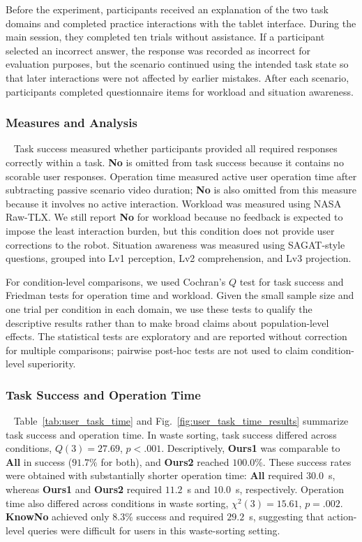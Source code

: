 Before the experiment, participants received an explanation of the two task domains and completed practice interactions with the tablet interface. During the main session, they completed ten trials without assistance. If a participant selected an incorrect answer, the response was recorded as incorrect for evaluation purposes, but the scenario continued using the intended task state so that later interactions were not affected by earlier mistakes. After each scenario, participants completed questionnaire items for workload and situation awareness.

\subsubsection{Measures and Analysis}~\label{user:measures}
Task success measured whether participants provided all required responses correctly within a task. \textbf{No} is omitted from task success because it contains no scorable user responses. Operation time measured active user operation time after subtracting passive scenario video duration; \textbf{No} is also omitted from this measure because it involves no active interaction. Workload was measured using NASA Raw-TLX. We still report \textbf{No} for workload because no feedback is expected to impose the least interaction burden, but this condition does not provide user corrections to the robot. Situation awareness was measured using SAGAT-style questions, grouped into Lv1 perception, Lv2 comprehension, and Lv3 projection.

For condition-level comparisons, we used Cochran's $Q$ test for task success and Friedman tests for operation time and workload. Given the small sample size and one trial per condition in each domain, we use these tests to qualify the descriptive results rather than to make broad claims about population-level effects. The statistical tests are exploratory and are reported without correction for multiple comparisons; pairwise post-hoc tests are not used to claim condition-level superiority.

\subsubsection{Task Success and Operation Time}~\label{user:results_task_time}
Table~\ref{tab:user_task_time} and Fig.~\ref{fig:user_task_time_results} summarize task success and operation time. In waste sorting, task success differed across conditions, $Q(3)=27.69$, $p<.001$. Descriptively, \textbf{Ours1} was comparable to \textbf{All} in success ($91.7\%$ for both), and \textbf{Ours2} reached $100.0\%$. These success rates were obtained with substantially shorter operation time: \textbf{All} required $30.0$~s, whereas \textbf{Ours1} and \textbf{Ours2} required $11.2$~s and $10.0$~s, respectively. Operation time also differed across conditions in waste sorting, $\chi^2(3)=15.61$, $p=.002$. \textbf{KnowNo} achieved only $8.3\%$ success and required $29.2$~s, suggesting that action-level queries were difficult for users in this waste-sorting setting.

